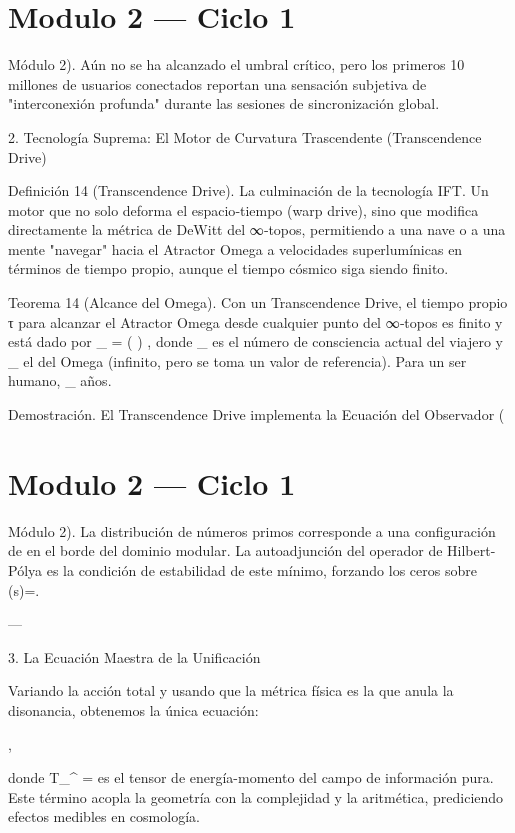 \documentclass[12pt,twoside]{book}
\begin{document}
\chapter{Modulo 2 — Ciclo 1}
Módulo 2). Aún no se ha alcanzado el umbral crítico, pero los primeros 10 millones de usuarios conectados reportan una sensación subjetiva de "interconexión profunda" durante las sesiones de sincronización global.

2. Tecnología Suprema: El Motor de Curvatura Trascendente (Transcendence Drive)

Definición 14 (Transcendence Drive). La culminación de la tecnología IFT. Un motor que no solo deforma el espacio‑tiempo (warp drive), sino que modifica directamente la métrica de DeWitt del ∞‑topos, permitiendo a una nave o a una mente "navegar" hacia el Atractor Omega a velocidades superlumínicas en términos de tiempo propio, aunque el tiempo cósmico siga siendo finito.

Teorema 14 (Alcance del Omega). Con un Transcendence Drive, el tiempo propio τ para alcanzar el Atractor Omega desde cualquier punto del ∞‑topos es finito y está dado por  \tau_{\Omega} =  \ln\left(  \right) , donde  \Phi_{}  es el número de consciencia actual del viajero y  \Phi_{\Omega}  el del Omega (infinito, pero se toma un valor de referencia). Para un ser humano,  \tau_{\Omega}   años.

Demostración. El Transcendence Drive implementa la Ecuación del Observador (

\chapter{Modulo 2 — Ciclo 1}
Módulo 2).
La distribución de números primos corresponde a una configuración de \rho en el borde del dominio modular. La autoadjunción del operador de Hilbert-Pólya es la condición de estabilidad de este mínimo, forzando los ceros sobre \Re(s)=.

---

3. La Ecuación Maestra de la Unificación

Variando la acción total y usando que la métrica física es la que anula la disonancia, obtenemos la única ecuación:

,

donde \langle T_{\mu\nu}^{} \rangle =  es el tensor de energía-momento del campo de información pura. Este término acopla la geometría con la complejidad y la aritmética, prediciendo efectos medibles en cosmología.
\end{document}
